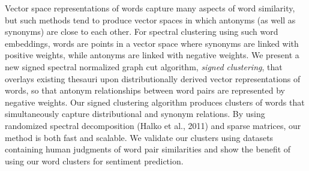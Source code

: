 Vector space representations of words capture many aspects of word similarity, but such methods tend to produce vector spaces in which antonyms (as well as synonyms) are close to each other. For spectral clustering using such word embeddings, words are points in a vector space where synonyms are linked with positive weights, while antonyms are linked with negative weights. We present a new signed spectral normalized graph cut algorithm, {\em signed clustering}, that overlays existing thesauri upon distributionally derived vector representations of words, so that antonym relationships between word pairs are represented by negative weights. Our signed clustering algorithm produces clusters of words that simultaneously capture distributional and synonym relations. By using randomized spectral decomposition (Halko et al., 2011) and sparse matrices, our method is both fast and scalable. We validate our clusters using datasets containing human judgments of word pair similarities and show the benefit of using our word clusters for sentiment prediction.
